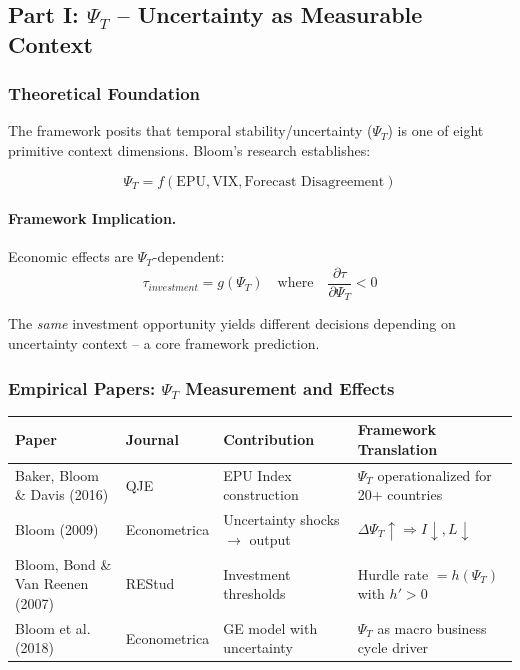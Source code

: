 \subsection{Part I: $\Psi_T$ – Uncertainty as Measurable Context}

\subsubsection{Theoretical Foundation}

The framework posits that temporal stability/uncertainty ($\Psi_T$) is one of 
eight primitive context dimensions. Bloom's research establishes:

\begin{equation}
\boxed{
\Psi_T = f(\text{EPU}, \text{VIX}, \text{Forecast Disagreement})
}
\label{eq:bloom-psi-t}
\end{equation}

\paragraph{Framework Implication.}
Economic effects are $\Psi_T$-dependent:
\begin{equation}
\tau_{investment} = g(\Psi_T) \quad \text{where} \quad \frac{\partial \tau}{\partial \Psi_T} < 0
\end{equation}

The \textit{same} investment opportunity yields different decisions depending on 
uncertainty context – a core framework prediction.

\subsubsection{Empirical Papers: $\Psi_T$ Measurement and Effects}

\begin{center}
\small
\renewcommand{\arraystretch}{1.3}
\begin{tabular}{|p{3.5cm}|p{2cm}|p{4cm}|p{4cm}|}
\hline
\textbf{Paper} & \textbf{Journal} & \textbf{Contribution} & \textbf{Framework Translation} \\
\hline
Baker, Bloom \& Davis (2016) & QJE & EPU Index construction & $\Psi_T$ operationalized for 20+ countries \\
\hline
Bloom (2009) & Econometrica & Uncertainty shocks $\to$ output & $\Delta\Psi_T \uparrow \Rightarrow I\downarrow, L\downarrow$ \\
\hline
Bloom, Bond \& Van Reenen (2007) & REStud & Investment thresholds & Hurdle rate $= h(\Psi_T)$ with $h' > 0$ \\
\hline
Bloom et al. (2018) & Econometrica & GE model with uncertainty & $\Psi_T$ as macro business cycle driver \\
\hline
\end{tabular}
\end{center}

